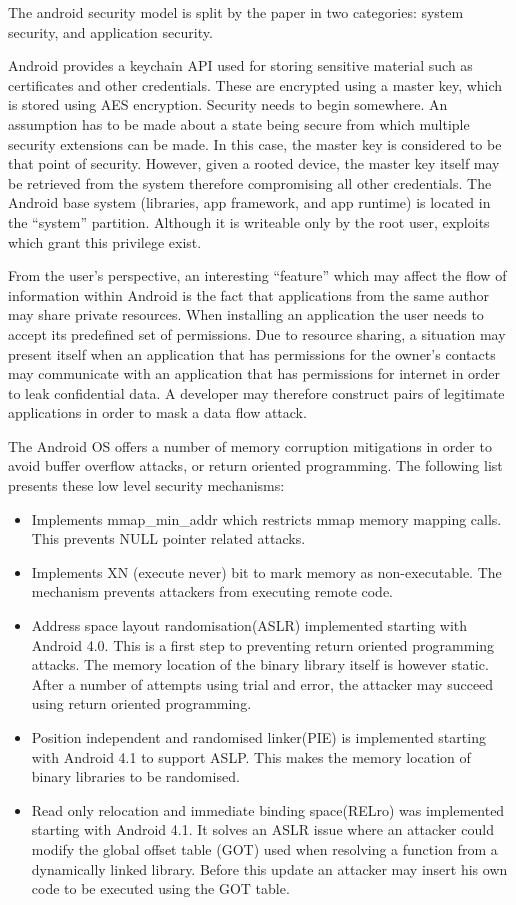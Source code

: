 The android security model is split by the paper in two categories: system security, and application security.

Android provides a keychain API used for storing sensitive material such as certificates and other credentials. These are encrypted using a master key, which is stored using AES encryption. Security needs to begin somewhere. An assumption has to be made about a state being secure from which multiple security extensions can be made. In this case, the master key is considered to be that point of security. However, given a rooted device, the master key itself may be retrieved from the system therefore compromising all other credentials. The Android base system (libraries, app framework, and app runtime) is located in the ``system'' partition. Although it is writeable only by the root user, exploits which grant this privilege exist. 

From the user's perspective, an interesting ``feature'' which may affect the flow of information within Android is the fact that applications from the same author may share private resources. When installing an application the user needs to accept its predefined set of permissions. Due to resource sharing, a situation may present itself when an application that has permissions for the owner's contacts may communicate with an application that has permissions for internet in order to leak confidential data. A developer may therefore construct pairs of legitimate applications in order to mask a data flow attack.

The Android OS offers a number of memory corruption mitigations in order to avoid buffer overflow attacks, or return oriented programming. The following list 
presents these low level security mechanisms:
\begin{itemize}
	\item Implements mmap\_min\_addr which restricts mmap memory mapping calls. This prevents NULL pointer related attacks.
	\item Implements XN (execute never) bit to mark memory as non-executable. The mechanism prevents attackers from executing remote code.
	\item Address space layout randomisation(ASLR) implemented starting with Android 4.0. This is a first step to preventing return oriented programming attacks. The memory location of the binary library itself is however static. After a number of attempts using trial and error, the attacker may succeed using return oriented programming.
	\item Position independent and randomised linker(PIE) is implemented starting with Android 4.1 to support ASLP. This makes the memory location of binary libraries to be randomised.
	\item Read only relocation and immediate binding space(RELro) was implemented starting with Android 4.1. It solves an ASLR issue where an attacker could modify the global offset table (GOT) used when resolving a function from a dynamically linked library. Before this update an attacker may insert his own code to be executed using the GOT table.
\end{itemize}

